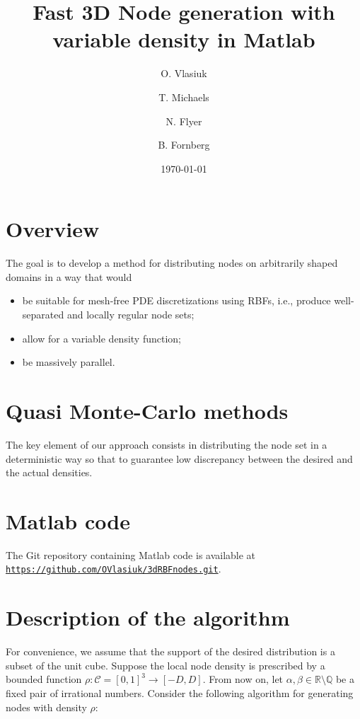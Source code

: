 \documentclass[10pt]{amsart}
\title{Fast 3D Node generation with variable density in Matlab}
\author{O. Vlasiuk}
\author{T. Michaels}
\author{N. Flyer}
\author{B. Fornberg}
\date{\today}
\begin{document}
\maketitle

\section{Overview}

The goal is to develop a method for distributing nodes on arbitrarily shaped domains in a way that would 
\begin{itemize}
 \item be suitable for mesh-free PDE discretizations using RBFs, i.e., produce well-separated and locally regular node sets;
 \item allow for a variable density function;
 \item be massively parallel.
\end{itemize}

\section{Quasi Monte-Carlo methods}

The key element of our approach consists in distributing the node set in a deterministic way so that to guarantee low discrepancy between the desired and the actual densities.



\section{Matlab code}

The Git repository containing Matlab code is available at  \texttt{\url{https://github.com/OVlasiuk/3dRBFnodes.git}}.

\section{Description of the algorithm}

For convenience, we assume that the support of the desired distribution is a subset of the unit cube. Suppose the local node density is prescribed by a bounded function $\rho: \mathcal{C} =[0,1]^3 \to [-D,D]$. From now on, let $ \alpha, \beta\in\mathbb{R}\setminus\mathbb{Q} $ be a fixed pair of irrational numbers. Consider the following algorithm for generating nodes with density $ \rho $:  
\end{document}
